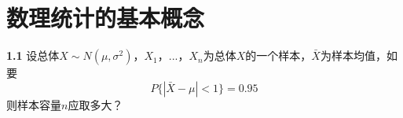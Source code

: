\section{数理统计的基本概念}

  \textbf{1.1} 设总体$X\sim{}N(\mu, \sigma{}^2)$，$X_{1}$，...，$X_{n}$为总体$X$的一个样本，$\bar{X}$为样本均值，如要
  $$ P\{|\bar{X}-\mu{}|<1\} = 0.95 $$
  则样本容量$n$应取多大？
